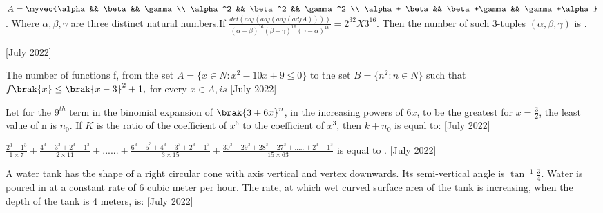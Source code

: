 \iffalse
  \title{2022}
  \author{ai24btech11005}
  \section{integer}
\fi
  \item $A= \myvec{\alpha && \beta && \gamma \\ \alpha^2 && \beta^2 && \gamma^2 \\ \alpha + \beta && \beta +\gamma && \gamma +\alpha}$ . Where $\alpha, \beta,\gamma$ are three distinct natural numbers.If $\frac{det(adj(adj(adj(adjA))))}{(\alpha - \beta)^{16} (\beta - \gamma)^{16} (\gamma -\alpha)^{16}} =2^{32} X 3^{16}$.  Then the number of such 3-tuples $(\alpha , \beta, \gamma)$ is .
  
    \hfill{[July 2022]}
    \item The number of functions f, from the set $A= \{x \in N: x^2-10x+9 \leq 0 \}$ to the set
    $B= \{ n^2 : n\in N\}$ such that $f\brak{x}\leq
     \brak{x-3}^2+1,$ for every $x \in A, is $
   \hfill{[July 2022]}
    \item Let for the $9^{th}$ term in the binomial expansion of $\brak{3+6x}^n$, in the increasing powers of $6x$, to be the greatest for $x=\frac{3}{2}$, the least value of n is $n_0$.  If $K$ 
    is the ratio of the coefficient of $x^6$ to the coefficient of $x^3$, then $k+n_0$ is equal to:
 \hfill{[July 2022]}

    \item $\frac{2^3-1^3}{1\times7} + \frac{4^3-3^3+2^3-1^3}{2\times 11} +......+\frac{6^3-5^3+4^3-3^3+2^3-1^3}{3\times 15} +\frac{30^3-29^3+28^3-27^3+.....+2^3-1^3}{15\times 63}$ is equal to .
\hfill{[July 2022]}
    \item A water tank has the shape of a right circular cone with axis vertical and vertex downwards. Its semi-vertical angle is $\tan^{-1}\frac{3}{4}$. Water is poured in at a constant rate of 6 cubic  meter per hour. The rate, at which wet curved surface area of the tank is increasing, when the depth of the tank is 4 meters, is:
   \hfill{[July 2022]}

